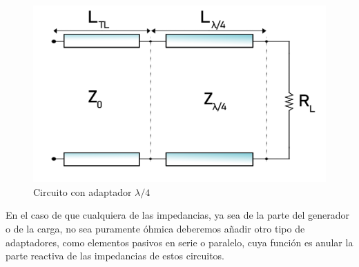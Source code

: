 \begin{figure}[h]
    \centering
        \includegraphics[width=12cm]{archivos/parche/lambda}
        \caption{Circuito con adaptador $\lambda/4$}
        \label{fig:lambdacuartos}
\end{figure}

\par En el caso de que cualquiera de las impedancias, ya sea de la parte del generador o de la carga, no sea puramente óhmica deberemos añadir otro tipo de adaptadores, como elementos pasivos en serie o paralelo, cuya función es anular la parte reactiva de las impedancias de estos circuitos.












